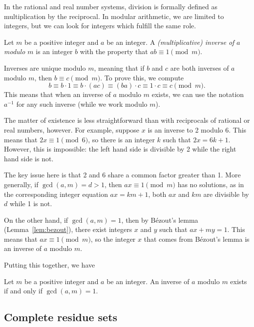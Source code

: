 In the rational and real number systems, division is formally defined as multiplication by the reciprocal. In modular arithmetic, we are limited to integers, but we can look for integers which fulfill the same role.

\begin{definition}
Let $m$ be a positive integer and $a$ be an integer. A \emph{(multiplicative) inverse of $a$ modulo $m$} is an integer $b$ with the property that $ab\equiv 1\pmod{m}$.
\end{definition}

Inverses are unique modulo $m$, meaning that if $b$ and $c$ are both inverses of $a$ modulo $m$, then $b\equiv c\pmod{m}$. To prove this, we compute
\begin{equation*}
b\equiv b\cdot 1\equiv b\cdot (ac)\equiv (ba)\cdot c\equiv 1\cdot c\equiv c\pmod{m}.
\end{equation*}
This means that when an inverse of $a$ modulo $m$ exists, we can use the notation $a^{-1}$ for any such inverse (while we work modulo $m$).

The matter of existence is less straightforward than with reciprocals of rational or real numbers, however. For example, suppose $x$ is an inverse to 2 modulo 6. This means that $2x\equiv 1\pmod{6}$, so there is an integer $k$ such that $2x = 6k + 1$. However, this is impossible: the left hand side is divisible by 2 while the right hand side is not.

The key issue here is that 2 and 6 share a common factor greater than 1. More generally, if $\gcd(a,m) = d > 1$, then $ax\equiv 1\pmod{m}$ has no solutions, as in the corresponding integer equation $ax = km + 1$, both $ax$ and $km$ are divisible by $d$ while 1 is not.

On the other hand, if $\gcd(a,m) = 1$, then by B\'{e}zout's lemma (Lemma~\ref{lem:bezout}), there exist integers $x$ and $y$ such that $ax + my = 1$. This means that $ax\equiv 1\pmod{m}$, so the integer $x$ that comes from B\'{e}zout's lemma is an inverse of $a$ modulo $m$.

Putting this together, we have
\begin{theorem}\label{thm:existence-of-inverses}
Let $m$ be a positive integer and $a$ be an integer. An inverse of $a$ modulo $m$ exists if and only if $\gcd(a,m) = 1$.
\end{theorem}



\subsection{Complete residue sets}


